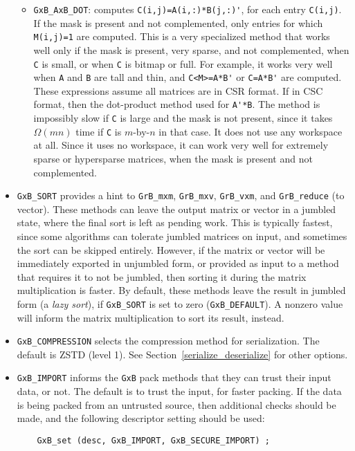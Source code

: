 \documentclass[12pt]{article}
\begin{document}
\begin{itemize}
\begin{itemize}
\item \verb'GxB_AxB_DOT': computes \verb"C(i,j)=A(i,:)*B(j,:)'", for each
    entry \verb'C(i,j)'.  If the mask is present and not complemented, only
    entries for which \verb'M(i,j)=1' are computed.  This is a very specialized
    method that works well only if the mask is present, very sparse, and not
    complemented, when \verb'C' is small, or when \verb'C' is bitmap or full.
    For example, it works very well
    when \verb'A' and \verb'B' are tall and thin, and \verb"C<M>=A*B'" or
    \verb"C=A*B'" are computed.  These expressions assume all matrices are in
    CSR format.  If in CSC format, then the dot-product method used for
    \verb"A'*B".  The method is impossibly slow if \verb'C' is large and the
    mask is not present, since it takes $\Omega(mn)$ time if \verb'C' is
    $m$-by-$n$ in that case.  It does not use any workspace at all.  Since it
    uses no workspace, it can work very well for extremely sparse or
    hypersparse matrices, when the mask is present and not complemented.

    \end{itemize}

\item \verb'GxB_SORT' provides a hint to \verb'GrB_mxm', \verb'GrB_mxv',
    \verb'GrB_vxm', and \verb'GrB_reduce' (to vector).  These methods can leave
    the output matrix or vector in a jumbled state, where the final sort is
    left as pending work.  This is typically fastest, since some algorithms can
    tolerate jumbled matrices on input, and sometimes the sort can be skipped
    entirely.  However, if the matrix or vector will be immediately exported in
    unjumbled form, or provided as input to a method that requires it to not be
    jumbled, then sorting it during the matrix multiplication is faster.
    By default, these methods leave the result in jumbled form (a {\em lazy
    sort}), if \verb'GxB_SORT' is set to zero (\verb'GxB_DEFAULT').  A nonzero
    value will inform the matrix multiplication to sort its result, instead.

\item \verb'GxB_COMPRESSION' selects the compression method for serialization.
    The default is ZSTD (level 1).  See Section~\ref{serialize_deserialize} for
    other options.

\item \verb'GxB_IMPORT' informs the \verb'GxB' pack methods
    that they can trust their input data, or not.  The default is to trust
    the input, for faster packing.  If the data is being packed from an
    untrusted source, then additional checks should be made, and the
    following descriptor setting should be used:

    {\footnotesize
    \begin{verbatim}
    GxB_set (desc, GxB_IMPORT, GxB_SECURE_IMPORT) ; \end{verbatim}}

\end{itemize}
\end{document}
